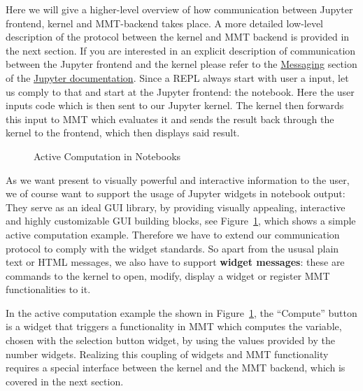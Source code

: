 Here we will give a higher-level overview of how communication between Jupyter frontend, kernel and MMT-backend takes place.
A more detailed low-level description of the protocol between the kernel and MMT backend is provided in the next section. If you are interested in an explicit description of communication between the Jupyter frontend and the kernel please refer to the \hyperlink{https://jupyter-client.readthedocs.io/en/latest/messaging.html}{Messaging} section of the \hyperlink{http://jupyter.org/documentation}{Jupyter documentation}.
Since a REPL always start with user a input, let us comply to that and start at the Jupyter frontend: the notebook.
Here the user inputs code which is then sent to our Jupyter kernel.
The kernel then forwards this input to MMT which evaluates it and sends the result back through the kernel to the frontend, which then displays said result.

\begin{figure}[ht]\centering
  \caption{Active Computation in Notebooks}\label{fig:active-computation}
\end{figure}

As we want present to visually powerful and interactive information to the user, we of course want to support the usage of Jupyter widgets in notebook output:
They serve as an ideal GUI library, by providing visually appealing, interactive and highly customizable GUI building blocks, see Figure~\ref{fig:active-computation}, which shows a simple active computation example.
Therefore we have to extend our communication protocol to comply with the widget standards. So apart from the ususal plain text or HTML messages, we also have to support \textbf{widget messages}: these are commands to the kernel to open, modify, display a widget or register MMT functionalities to it.

In the active computation example the shown in Figure~\ref{fig:active-computation}, the ``Compute'' button is a widget that triggers a functionality in MMT which computes the variable, chosen with the selection button widget, by using the values provided by the number widgets. Realizing this coupling of widgets and MMT functionality requires a special interface between the kernel and the MMT backend, which is covered in the next section.


